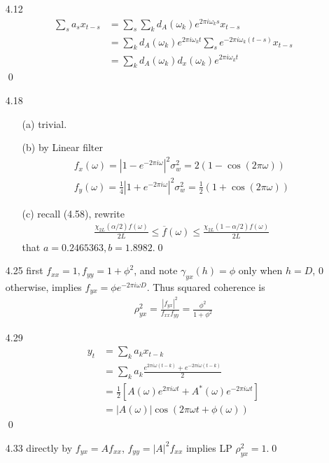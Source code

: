\documentclass[paper=a4, fontsize=11pt]{scrartcl} %
\numberwithin{equation}{section} %
\numberwithin{figure}{section} %
\numberwithin{table}{section} %
\begin{document}
\begin{itemize}
\begin{itemize}
\begin{align}
				&= 2 (d_c^2 + d_s^2)\\
				&= 2 I
		\end{align}\qed
	\end{itemize}
	\item[4.12]
	\begin{align}
		\sum_s a_s x_{t-s} &= \sum_s \sum_k d_A(\omega_k)e^{2\pi i\omega_k s} x_{t-s}\\
			&= \sum_k d_A(\omega_k)e^{2\pi i\omega_k t} \sum_s e^{-2\pi i\omega_k (t-s)}x_{t-s}\\
			&= \sum_k d_A(\omega_k)d_x(\omega_k) e^{2\pi i\omega_k t}
	\end{align}\qed
	\item[4.18]
	\begin{itemize}
		\item[(a)] trivial.
		\item[(b)] by Linear filter
		\begin{align}
			f_x(\omega) = |1-e^{-2\pi i\omega}|^2\sigma_w^2 = 2(1-\cos(2\pi \omega))\\
			f_y(\omega) = \frac{1}{4}|1+e^{-2\pi i\omega}|^2\sigma_w^2 = \frac{1}{2}(1+\cos(2\pi\omega))
		\end{align}
		\item[(c)] recall (4.58), rewrite
		\begin{align}
			\frac{\chi_{2L}(\alpha/2)f(\omega)}{2L} \leq \overline{f}(\omega)\leq \frac{\chi_{2L}(1-\alpha/2)f(\omega)}{2L} 
		\end{align}
		that $a=0.2465363, b=1.8982$.\qed
	\end{itemize}
	\item[4.25] first $f_{xx}=1,f_{yy}=1+\phi^2$, and note $\gamma_{yx}(h)=\phi$ only when $h=D$, $0$ otherwise, implies $f_{yx}=\phi e^{-2\pi i\omega D}$. Thus squared coherence is
	\begin{align}
		\rho_{yx}^2 = \frac{|f_{yx}|^2}{f_{xx}f_{yy}} = \frac{\phi^2}{1+\phi^2}
	\end{align}
	\item[4.29]
	\begin{align}
		y_t &= \sum_k a_k x_{t-k}\\
			&= \sum_k a_k \frac{e^{2\pi i \omega (t-k)} + e^{-2\pi i \omega (t-k)}}{2}\\
			&= \frac{1}{2}[A(\omega)e^{2\pi i\omega t} + A^*(\omega)e^{-2\pi i\omega t}]\\
			&= |A(\omega)|\cos(2\pi \omega t + \phi(\omega))
	\end{align}\qed
	\item[4.33] directly by $f_{yx}=A f_{xx}$, $f_{yy}=|A|^2f_{xx}$ implies LP $\rho_{yx}^2=1$.\qed
\end{itemize}
\end{document}
